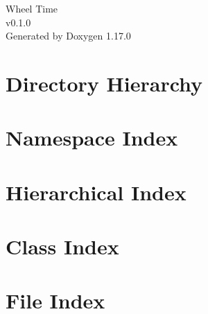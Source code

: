 \documentclass[twoside]{book}
\newcommand{\+}{\discretionary{\mbox{\scriptsize$\hookleftarrow$}}{}{}}
\newcommand{\clearemptydoublepage}{%
    \newpage{\pagestyle{empty}\cleardoublepage}%
  }
\begin{document}
  \raggedbottom
    \hypersetup{pageanchor=false,
                bookmarksnumbered=true,
                pdfencoding=unicode
               }
  \begin{titlepage}
  \vspace*{7cm}
  \begin{center}%
  {\Large Wheel Time}\\
  [1ex]\large v0.\+1.\+0 \\
  \vspace*{1cm}
  {\large Generated by Doxygen 1.17.0}\\
  \end{center}
  \end{titlepage}
  \clearemptydoublepage
  \tableofcontents
  \clearemptydoublepage
  \hypersetup{pageanchor=true}















\chapter{Directory Hierarchy}

\chapter{Namespace Index}

\chapter{Hierarchical Index}

\chapter{Class Index}

\chapter{File Index}

\end{document}
